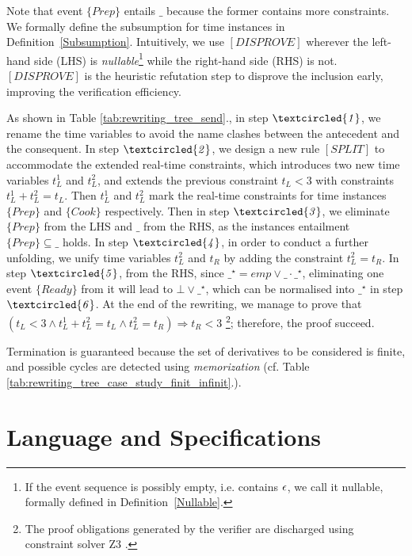 \documentclass[acmsmall,10pt,review]{acmart}
\newcommand{\code}[1]{{\tt{\ensuremath{\m{#1}}}}}
\newcommand{\empt}{\textcolor{black}{\ensuremath{\epsilon}}}
\newcommand{\m}{\mathit}
\newcommand\tabref[1]{Table \textcolor{black}{\ref{#1}}.}
\newcommand\defref[1]{Definition~\textcolor{blue}{\ref{#1}}}
\begin{document}
{Note that event \code{\{Prep\}} entails \code{\_} because the former contains more constraints. We formally define the subsumption for time instances in \defref{Subsumption}.
Intuitively, we use \code{[DISPROVE]} wherever the left-hand side (LHS) is \emph{nullable}\footnote{If the event sequence is possibly empty, i.e. contains \code{\empt}, we call it nullable, formally defined in \defref{Nullable}.} while the right-hand side (RHS) is not. 
\code{[DISPROVE]} is the heuristic refutation step to disprove the inclusion early, improving the verification efficiency.


As shown in \tabref{tab:rewriting_tree_send}, in step \code{\textcircled{1}}, we rename the time variables to avoid the name clashes between the antecedent and the consequent.  
In step \code{\textcircled{2}}, we design a new rule \code{[SPLIT]} to accommodate the extended real-time constraints, which introduces two new time variables \code{t_L^1} and \code{t_L^2}, and 
extends the previous constraint \code{t_L {<} 3} with constraints  \code{t_L^1 {+} t_L^2 {=} t_L}. Then \code{t_L^1} and \code{t_L^2} mark the real-time constraints for time instances  \code{\{Prep\}} and \code{\{Cook\}} respectively. 
Then in step \code{\textcircled{3}}, we eliminate \code{\{Prep\}} from the LHS and \code{\_} from the RHS, as the instances entailment  \code{\{Prep\} \subseteq \_} holds.  
In step \code{\textcircled{4}}, in order to conduct a further unfolding, we unify time variables \code{t_L^2} and \code{t_R} by adding the constraint \code{t_L^2 {=} t_R}. 
In step \code{\textcircled{5}}, from the RHS, since \code{\_^\star {=} emp \vee \_ \cdot \_^\star}, eliminating one event \code{\{Ready\}} from it will lead to \code{\bot \vee \_^\star}, which can be normalised into \code{\_^\star} in step \code{\textcircled{6}}.
At the end of the rewriting, we manage to prove that \code{(t_L {<}3 {\wedge} t_L^1 {+} t_L^2 {=}t_L {\wedge}t_L^2 {=} t_R)  \Rightarrow  t_R {<} 3} \footnote{The proof obligations generated by the verifier are discharged using constraint solver Z3 \cite{de2008z3}.}; therefore, the proof succeed.

Termination is guaranteed because the set of derivatives to be considered is finite, and possible cycles are detected using \emph{memorization} \cite{brotherston2005cyclic} (cf. \tabref{tab:rewriting_tree_case_study_finit_infinit}). 



\section{Language and Specifications}
\label{sec:LanguageSpecifications}

}
\end{document}
